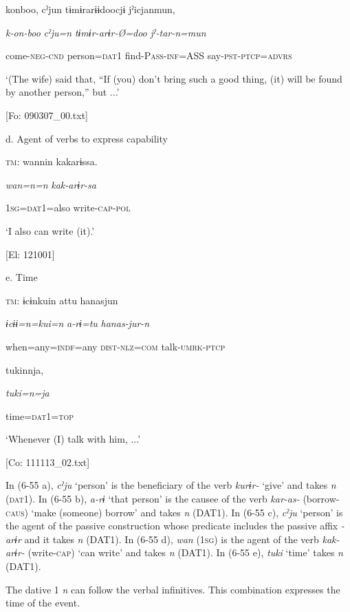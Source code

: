       konboo,  cˀjun  tɨmɨrarɨɨdoocjɨ  jˀicjanmun,

      \textit{k-on-boo}  \textit{cˀju=n}  \textit{tɨmɨr-arɨr-Ø=doo}  \textit{jˀ-tar-n=mun}

      come-\textsc{neg}-\textsc{cnd}  person=\textsc{dat}1  find{}-P\textsc{ass}-\textsc{inf}=ASS  say{}-\textsc{pst}-\textsc{ptcp}=\textsc{advrs}

      ‘(The wife) said that, “If (you) don’t bring such a good thing, (it) will be found by another person,” but ...’

      [Fo: 090307\_00.txt]

  d.  Agent of verbs to express capability

    \textsc{tm}:  wannin  kakarɨssa.

      \textit{wan=n=n}  \textit{kak-arɨr-sa}

      1\textsc{sg}=\textsc{dat}1=also  write-\textsc{cap}-\textsc{pol}

      ‘I also can write (it).’

      [El: 121001]

  e.  Time

    \textsc{tm}:  ɨcɨnkuin  attu  hanasjun

      \textit{ɨcɨɨ=n=kui=n}  \textit{a-rɨ=tu}  \textit{hanas-jur-n}

      when=any=\textsc{indf}=any  \textsc{dist}-\textsc{nlz}=\textsc{com}  talk-\textsc{umrk}-\textsc{ptcp}

      tukinnja,

      \textit{tuki=n=ja}

      time=\textsc{dat}1=\textsc{top}

      ‘Whenever (I) talk with him, ...’

      [Co: 111113\_02.txt]

In (6-55 a), \textit{cˀju} ‘person’ is the beneficiary of the verb \textit{kurɨr-} ‘give’ and takes \textit{n} (\textsc{dat}1). In (6-55 b), \textit{a-rɨ} ‘that person’ is the causee of the verb \textit{kar-as-} (borrow-\textsc{caus}) ‘make (someone) borrow’ and takes \textit{n} (DAT1). In (6-55 c), \textit{cˀju} ‘person’ is the agent of the passive construction whose predicate includes the passive affix \textit{{}-arɨr} and it takes \textit{n} (DAT1). In (6-55 d), \textit{wan} (1\textsc{sg}) is the agent of the verb \textit{kak-arɨr-} (write-\textsc{cap}) ‘can write’ and takes \textit{n} (DAT1). In (6-55 e), \textit{tuki} ‘time’ takes \textit{n} (DAT1).

  The dative 1 \textit{n} can follow the verbal infinitives. This combination expresses the time of the event.

